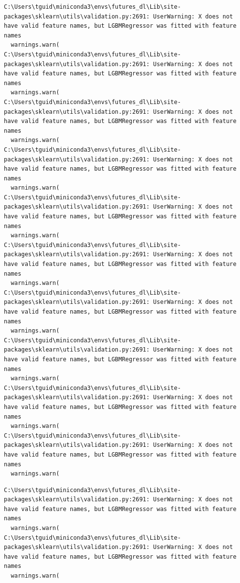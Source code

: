\begin{verbatim}
C:\Users\tguid\miniconda3\envs\futures_dl\Lib\site-packages\sklearn\utils\validation.py:2691: UserWarning: X does not have valid feature names, but LGBMRegressor was fitted with feature names
  warnings.warn(
C:\Users\tguid\miniconda3\envs\futures_dl\Lib\site-packages\sklearn\utils\validation.py:2691: UserWarning: X does not have valid feature names, but LGBMRegressor was fitted with feature names
  warnings.warn(
C:\Users\tguid\miniconda3\envs\futures_dl\Lib\site-packages\sklearn\utils\validation.py:2691: UserWarning: X does not have valid feature names, but LGBMRegressor was fitted with feature names
  warnings.warn(
C:\Users\tguid\miniconda3\envs\futures_dl\Lib\site-packages\sklearn\utils\validation.py:2691: UserWarning: X does not have valid feature names, but LGBMRegressor was fitted with feature names
  warnings.warn(
C:\Users\tguid\miniconda3\envs\futures_dl\Lib\site-packages\sklearn\utils\validation.py:2691: UserWarning: X does not have valid feature names, but LGBMRegressor was fitted with feature names
  warnings.warn(
C:\Users\tguid\miniconda3\envs\futures_dl\Lib\site-packages\sklearn\utils\validation.py:2691: UserWarning: X does not have valid feature names, but LGBMRegressor was fitted with feature names
  warnings.warn(
C:\Users\tguid\miniconda3\envs\futures_dl\Lib\site-packages\sklearn\utils\validation.py:2691: UserWarning: X does not have valid feature names, but LGBMRegressor was fitted with feature names
  warnings.warn(
C:\Users\tguid\miniconda3\envs\futures_dl\Lib\site-packages\sklearn\utils\validation.py:2691: UserWarning: X does not have valid feature names, but LGBMRegressor was fitted with feature names
  warnings.warn(
C:\Users\tguid\miniconda3\envs\futures_dl\Lib\site-packages\sklearn\utils\validation.py:2691: UserWarning: X does not have valid feature names, but LGBMRegressor was fitted with feature names
  warnings.warn(
C:\Users\tguid\miniconda3\envs\futures_dl\Lib\site-packages\sklearn\utils\validation.py:2691: UserWarning: X does not have valid feature names, but LGBMRegressor was fitted with feature names
  warnings.warn(
\end{verbatim}

\begin{verbatim}
C:\Users\tguid\miniconda3\envs\futures_dl\Lib\site-packages\sklearn\utils\validation.py:2691: UserWarning: X does not have valid feature names, but LGBMRegressor was fitted with feature names
  warnings.warn(
C:\Users\tguid\miniconda3\envs\futures_dl\Lib\site-packages\sklearn\utils\validation.py:2691: UserWarning: X does not have valid feature names, but LGBMRegressor was fitted with feature names
  warnings.warn(
\end{verbatim}

